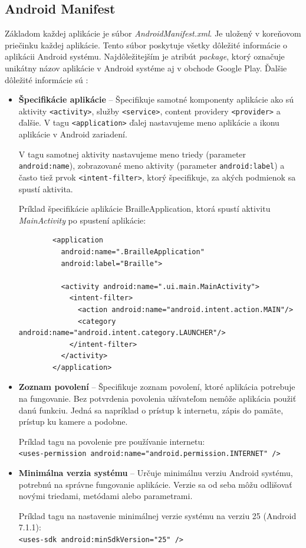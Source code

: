 \documentclass{template/socthesis}
\begin{document}
\subsection*{Android Manifest}
Základom každej aplikácie je súbor \textit{AndroidManifest.xml}. Je uložený v koreňovom priečinku každej aplikácie. Tento súbor poskytuje všetky dôležité informácie o aplikácii Android systému. Najdôležitejším je atribút \textit{package}, ktorý označuje unikátny názov aplikácie v Android systéme aj v obchode Google Play. Ďalšie dôležité informácie sú \cite{9781118387108}:
\begin{itemize}
	\item \textbf{Špecifikácie aplikácie} -- Špecifikuje samotné komponenty aplikácie ako sú aktivity \texttt{<activity>}, služby \texttt{<service>}, content providery \texttt{<provider>} a ďalšie. V tagu \texttt{<application>} ďalej nastavujeme meno aplikácie a ikonu aplikácie v Android zariadení. 
	
	V tagu samotnej aktivity nastavujeme meno triedy (parameter \texttt{android:name}), zobrazované meno aktivity (parameter \texttt{android:label}) a často tiež prvok \texttt{<intent-filter>}, ktorý špecifikuje, za akých podmienok sa spustí aktivita.
	
	Príklad špecifikácie aplikácie BrailleApplication, ktorá spustí aktivitu \textit{MainActivity} po spustení aplikácie:
	
	\begin{verbatim}
		<application
		  android:name=".BrailleApplication"
		  android:label="Braille">
		
		  <activity android:name=".ui.main.MainActivity">
		    <intent-filter>
		      <action android:name="android.intent.action.MAIN"/>
		      <category android:name="android.intent.category.LAUNCHER"/>
		    </intent-filter>
		  </activity>
		</application>
	\end{verbatim}
	
	
	\item \textbf{Zoznam povolení} -- Špecifikuje zoznam povolení, ktoré aplikácia potrebuje na fungovanie. Bez potvrdenia povolenia užívateľom nemôže aplikácia použiť danú funkciu. Jedná sa napríklad o prístup k internetu, zápis do pamäte, prístup ku kamere a podobne.
	
	Príklad tagu na povolenie pre používanie internetu: \\
	\texttt{<uses-permission   android:name="android.permission.INTERNET" />
	}
	\item \textbf{Minimálna verzia systému} -- Určuje minimálnu verziu Android systému, potrebnú na správne fungovanie aplikácie. Verzie sa od seba môžu odlišovať novými triedami, metódami alebo parametrami. 
	
	Príklad tagu na nastavenie minimálnej verzie systému na verziu 25 (Android 7.1.1): \\
	\texttt{<uses-sdk android:minSdkVersion="25" />}	
\end{itemize}
\end{document}
